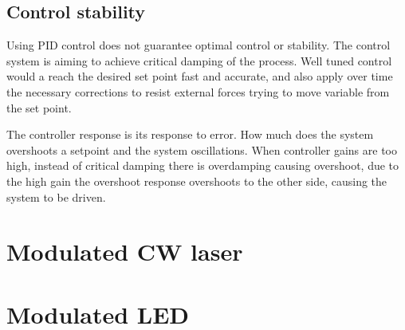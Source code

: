 \documentclass[\main/master.tex]{subfiles}
\begin{document}
\subsection{Control stability}
Using PID control does not guarantee optimal control or stability. The control system is aiming to achieve critical damping of the process. Well tuned control would a reach the desired set point fast and accurate, and also apply over time the necessary corrections to resist external forces trying to move variable from the set point.
\par\noindent
The controller response is its response to error. How much does the system overshoots a setpoint and the system oscillations. When controller gains are too high, instead of critical damping there is overdamping causing overshoot, due to the high gain the overshoot response overshoots to the other side, causing the system to be driven.










\section{Modulated CW laser}


\section{Modulated LED}
\end{document}

